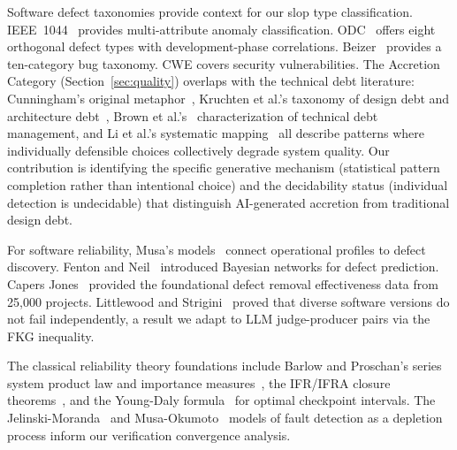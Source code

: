 \documentclass[11pt, a4paper, logo, copyright]{googledeepmind}
\begin{document}
Software defect taxonomies provide context for our slop type classification. IEEE~1044~\citep{ieee1044} provides multi-attribute anomaly classification. ODC~\citep{chillarege1992} offers eight orthogonal defect types with development-phase correlations. Beizer~\citep{beizer1990} provides a ten-category bug taxonomy. CWE covers security vulnerabilities. The Accretion Category (Section~\ref{sec:quality}) overlaps with the technical debt literature: Cunningham's original metaphor~\citep{cunningham1992}, Kruchten et al.'s taxonomy of design debt and architecture debt~\citep{kruchten2012}, Brown et al.'s~\citep{brown2010} characterization of technical debt management, and Li et al.'s systematic mapping~\citep{li2015} all describe patterns where individually defensible choices collectively degrade system quality. Our contribution is identifying the specific generative mechanism (statistical pattern completion rather than intentional choice) and the decidability status (individual detection is undecidable) that distinguish AI-generated accretion from traditional design debt.

For software reliability, Musa's models~\citep{musa1987} connect operational profiles to defect discovery. Fenton and Neil~\citep{fenton1999} introduced Bayesian networks for defect prediction. Capers Jones~\citep{capersjones2012} provided the foundational defect removal effectiveness data from 25,000 projects. Littlewood and Strigini~\citep{littlewood1993, littlewood2000} proved that diverse software versions do not fail independently, a result we adapt to LLM judge-producer pairs via the FKG inequality.

The classical reliability theory foundations include Barlow and Proschan's series system product law and importance measures~\citep{barlow1965mathematical, barlow1975statistical}, the IFR/IFRA closure theorems~\citep{birnbaum1961stochastic}, and the Young-Daly formula~\citep{young1974first, daly2006higher} for optimal checkpoint intervals. The Jelinski-Moranda~\citep{jelinski1972software} and Musa-Okumoto~\citep{musa1984logarithmic} models of fault detection as a depletion process inform our verification convergence analysis.
\end{document}
